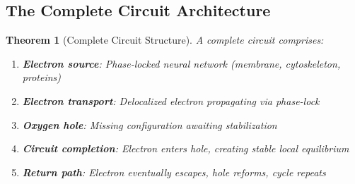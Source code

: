 \documentclass[11pt]{article}
\newtheorem{theorem}{Theorem}[section]
\theoremstyle{remark}
\begin{document}
\subsection{The Complete Circuit Architecture}

\begin{theorem}[Complete Circuit Structure]
\label{thm:complete_circuit}
A complete circuit comprises:
\begin{enumerate}
\item \textbf{Electron source}: Phase-locked neural network (membrane, cytoskeleton, proteins)
\item \textbf{Electron transport}: Delocalized electron propagating via phase-lock
\item \textbf{Oxygen hole}: Missing  configuration awaiting stabilization
\item \textbf{Circuit completion}: Electron enters hole, creating stable local equilibrium
\item \textbf{Return path}: Electron eventually escapes, hole reforms, cycle repeats
\end{enumerate}
\end{theorem}
\end{document}
